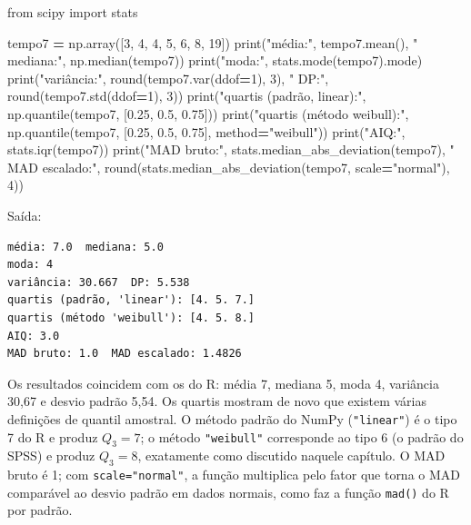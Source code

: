 \documentclass[
]{book}
\newenvironment{Shaded}{\begin{snugshade}}{\end{snugshade}}
\newcommand{\BuiltInTok}[1]{#1}
\newcommand{\DecValTok}[1]{\textcolor[rgb]{0.00,0.00,0.81}{#1}}
\newcommand{\FloatTok}[1]{\textcolor[rgb]{0.00,0.00,0.81}{#1}}
\newcommand{\ImportTok}[1]{#1}
\newcommand{\NormalTok}[1]{#1}
\newcommand{\OperatorTok}[1]{\textcolor[rgb]{0.81,0.36,0.00}{\textbf{#1}}}
\newcommand{\StringTok}[1]{\textcolor[rgb]{0.31,0.60,0.02}{#1}}
\begin{document}
\begin{Shaded}
\begin{Highlighting}[]
\ImportTok{from}\NormalTok{ scipy }\ImportTok{import}\NormalTok{ stats}

\NormalTok{tempo7 }\OperatorTok{=}\NormalTok{ np.array([}\DecValTok{3}\NormalTok{, }\DecValTok{4}\NormalTok{, }\DecValTok{4}\NormalTok{, }\DecValTok{5}\NormalTok{, }\DecValTok{6}\NormalTok{, }\DecValTok{8}\NormalTok{, }\DecValTok{19}\NormalTok{])}
\BuiltInTok{print}\NormalTok{(}\StringTok{"média:"}\NormalTok{, tempo7.mean(), }\StringTok{" mediana:"}\NormalTok{, np.median(tempo7))}
\BuiltInTok{print}\NormalTok{(}\StringTok{"moda:"}\NormalTok{, stats.mode(tempo7).mode)}
\BuiltInTok{print}\NormalTok{(}\StringTok{"variância:"}\NormalTok{, }\BuiltInTok{round}\NormalTok{(tempo7.var(ddof}\OperatorTok{=}\DecValTok{1}\NormalTok{), }\DecValTok{3}\NormalTok{), }\StringTok{" DP:"}\NormalTok{, }\BuiltInTok{round}\NormalTok{(tempo7.std(ddof}\OperatorTok{=}\DecValTok{1}\NormalTok{), }\DecValTok{3}\NormalTok{))}
\BuiltInTok{print}\NormalTok{(}\StringTok{"quartis (padrão, \textquotesingle{}linear\textquotesingle{}):"}\NormalTok{, np.quantile(tempo7, [}\FloatTok{0.25}\NormalTok{, }\FloatTok{0.5}\NormalTok{, }\FloatTok{0.75}\NormalTok{]))}
\BuiltInTok{print}\NormalTok{(}\StringTok{"quartis (método \textquotesingle{}weibull\textquotesingle{}):"}\NormalTok{, np.quantile(tempo7, [}\FloatTok{0.25}\NormalTok{, }\FloatTok{0.5}\NormalTok{, }\FloatTok{0.75}\NormalTok{], method}\OperatorTok{=}\StringTok{"weibull"}\NormalTok{))}
\BuiltInTok{print}\NormalTok{(}\StringTok{"AIQ:"}\NormalTok{, stats.iqr(tempo7))}
\BuiltInTok{print}\NormalTok{(}\StringTok{"MAD bruto:"}\NormalTok{, stats.median\_abs\_deviation(tempo7),}
      \StringTok{" MAD escalado:"}\NormalTok{, }\BuiltInTok{round}\NormalTok{(stats.median\_abs\_deviation(tempo7, scale}\OperatorTok{=}\StringTok{"normal"}\NormalTok{), }\DecValTok{4}\NormalTok{))}
\end{Highlighting}
\end{Shaded}

Saída:

\begin{verbatim}
média: 7.0  mediana: 5.0
moda: 4
variância: 30.667  DP: 5.538
quartis (padrão, 'linear'): [4. 5. 7.]
quartis (método 'weibull'): [4. 5. 8.]
AIQ: 3.0
MAD bruto: 1.0  MAD escalado: 1.4826
\end{verbatim}

Os resultados coincidem com os do R: média 7, mediana 5, moda 4, variância 30,67 e desvio padrão 5,54. Os quartis mostram de novo que existem várias definições de quantil amostral. O método padrão do NumPy (\texttt{"linear"}) é o tipo 7 do R e produz \(Q_3 = 7\); o método \texttt{"weibull"} corresponde ao tipo 6 (o padrão do SPSS) e produz \(Q_3 = 8\), exatamente como discutido naquele capítulo. O MAD bruto é 1; com \texttt{scale="normal"}, a função multiplica pelo fator que torna o MAD comparável ao desvio padrão em dados normais, como faz a função \texttt{mad()} do R por padrão.
\end{document}
